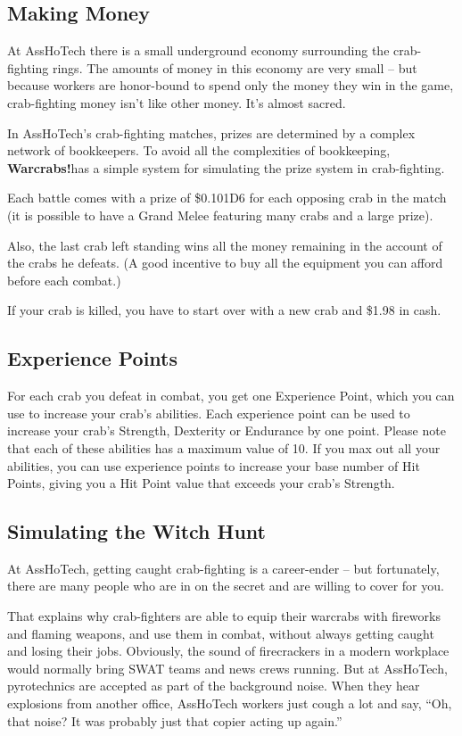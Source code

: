\documentclass[a4paper,10pt]{article}
\newcommand{\warcrabs}{\textbf{Warcrabs!}}
\begin{document}
\subsection*{Making Money}
\label{sec:MakingMoney}
At AssHoTech there is a small underground economy surrounding the crab-fighting rings. The amounts of money in this economy are very small -- but because workers are honor-bound to spend only the money they win in the game, crab-fighting money isn't like other money. It's almost sacred.

In AssHoTech's crab-fighting matches, prizes are determined by a complex network of bookkeepers. To avoid all the complexities of bookkeeping, \warcrabs\hspace*{4pt}has a simple system for simulating the prize system in crab-fighting.

Each battle comes with a prize of \$0.10\texttimes1D6 for each opposing crab in the match (it is possible to have a Grand Melee featuring many crabs and a large prize).

Also, the last crab left standing wins all the money remaining in the account of the crabs he defeats. (A good incentive to buy all the equipment you can afford before each combat.)

If your crab is killed, you have to start over with a new crab and \$1.98 in cash.

\subsection*{Experience Points}
\label{sec:ExperiencePoints}
For each crab you defeat in combat, you get one Experience Point, which you can use to increase your crab's abilities. Each experience point can be used to increase your crab's Strength, Dexterity or Endurance by one point. Please note that each of these abilities has a maximum value of 10. If you max out all your abilities, you can use experience points to increase your base number of Hit Points, giving you a Hit Point value that exceeds your crab's Strength.

\subsection*{Simulating the Witch Hunt}
\label{sec:SimulatingtheWitchHunt}
At AssHoTech, getting caught crab-fighting is a career-ender -- but fortunately, there are many people who are in on the secret and are willing to cover for you.

That explains why crab-fighters are able to equip their warcrabs with fireworks and flaming weapons, and use them in combat, without always getting caught and losing their jobs. Obviously, the sound of firecrackers in a modern workplace would normally bring SWAT teams and news crews running. But at AssHoTech, pyrotechnics are accepted as part of the background noise. When they hear explosions from another office, AssHoTech workers just cough a lot and say, ``Oh, that noise? It was probably just that copier acting up again.''
\end{document}
